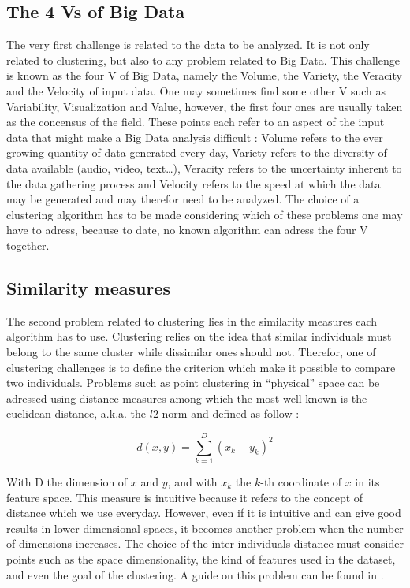 \documentclass[a4paper]{report}
\begin{document}
    \subsection{The 4 Vs of Big Data}
    The very first challenge is related to the data to be analyzed. It is not only related to clustering, but also to any problem related to Big Data. This challenge is known as the four V of Big Data, namely the Volume, the Variety, the Veracity and the Velocity of input data. One may sometimes find some other V such as Variability, Visualization and Value, however, the first four ones are usually taken as the concensus of the field. These points each refer to an aspect of the input data that might make a Big Data analysis difficult : Volume refers to the ever growing quantity of data generated every day, Variety refers to the diversity of data available (audio, video, text\ldots), Veracity refers to the uncertainty inherent to the data gathering process and Velocity refers to the speed at which the data may be generated and may therefor need to be analyzed. The choice of a clustering algorithm has to be made considering which of these problems one may have to adress, because to date, no known algorithm can adress the four V together.

    \subsection{Similarity measures}
    The second problem related to clustering lies in the similarity measures each algorithm has to use. Clustering relies on the idea that similar individuals must belong to the same cluster while dissimilar ones should not. Therefor, one of clustering challenges is to define the criterion which make it possible to compare two individuals. Problems such as point clustering in ``physical'' space can be adressed using distance measures among which the most well-known is the euclidean distance, a.k.a. the $l2$-norm and defined as follow : 
    
    \begin{equation}
        d(x,y) = \sum_{k=1}^D (x_k - y_k)^2
    \end{equation}

    With D the dimension of $x$ and $y$, and with $x_k$ the $k$-th coordinate of $x$ in its feature space. This measure is intuitive because it refers to the concept of distance which we use everyday. However, even if it is intuitive and can give good results in lower dimensional spaces, it becomes another problem when the number of dimensions increases. The choice of the inter-individuals distance must consider points such as the space dimensionality, the kind of features used in the dataset, and even the goal of the clustering. A guide on this problem can be found in \cite{domingos2012few}.
\end{document}

